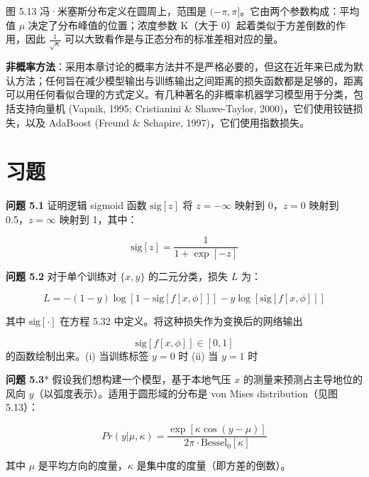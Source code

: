 \documentclass[lang=cn,newtx,10pt,scheme=chinese]{elegantbook}
\begin{document}
图 5.13 冯·米塞斯分布定义在圆周上，范围是 \((−\pi, \pi]\)。它由两个参数构成：平均值 \(\mu\) 决定了分布峰值的位置；浓度参数 K（大于 0）起着类似于方差倒数的作用，因此 \(\frac{1}{\sqrt{\kappa}}\) 可以大致看作是与正态分布的标准差相对应的量。

\textbf{非概率方法}：采用本章讨论的概率方法并不是严格必要的，但这在近年来已成为默认方法；任何旨在减少模型输出与训练输出之间距离的损失函数都是足够的，距离可以用任何看似合理的方式定义。有几种著名的非概率机器学习模型用于分类，包括支持向量机 (Vapnik, 1995; Cristianini \& Shawe-Taylor, 2000)，它们使用铰链损失，以及 AdaBoost (Freund \& Schapire, 1997)，它们使用指数损失。


\section{习题}

\textbf{问题 5.1} 证明逻辑 sigmoid 函数 \(\text{sig}[z]\) 将 \(z = -\infty\) 映射到 0，\(z = 0\) 映射到 0.5，\(z = \infty\) 映射到 1，其中：

\begin{equation}
\text{sig}[z] = \frac{1}{1 + \exp[-z]} 
\end{equation}

\textbf{问题 5.2} 对于单个训练对 \(\{x, y\}\) 的二元分类，损失 \(L\) 为：

\begin{equation}
L = -(1 - y) \log [1 - \text{sig}[f[x, \phi]]] - y \log [\text{sig}[f[x, \phi]]] 
\end{equation}

其中 \(\text{sig}[\cdot]\) 在方程 5.32 中定义。将这种损失作为变换后的网络输出 

\begin{equation*}
	\text{sig}[f[x, \phi]] \in [0, 1]	
\end{equation*}
的函数绘制出来。(i) 当训练标签 \(y = 0\) 时 \hspace*{\fill} (ii) 当 \(y = 1\) 时 \hspace*{\fill} 


\textbf{问题 5.3}* 假设我们想构建一个模型，基于本地气压 \(x\) 的测量来预测占主导地位的风向 \(y\)（以弧度表示）。适用于圆形域的分布是 von Mises distribution（见图 5.13）：

\begin{equation}
Pr(y|\mu, \kappa) = \frac{\exp[\kappa \cos(y - \mu)]}{2\pi \cdot \text{Bessel}_0[\kappa]} 
\end{equation}

其中 \(\mu\) 是平均方向的度量，\(\kappa\) 是集中度的度量（即方差的倒数）。
\end{document}
